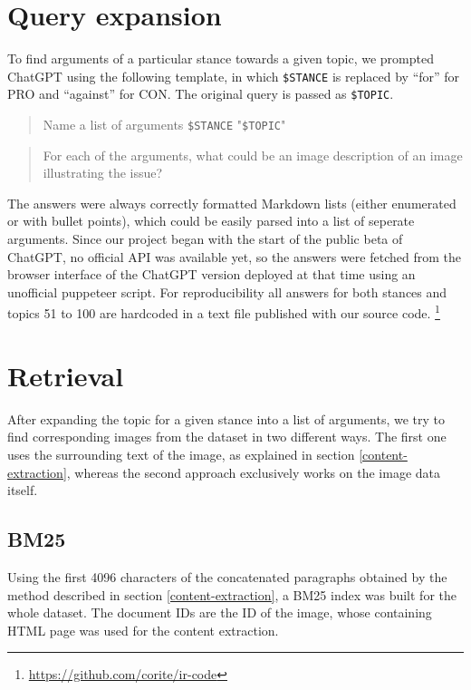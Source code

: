 \documentclass[
]{ceurart}
\begin{document}
\section{Query expansion}

To find arguments of a particular stance towards a given topic, we prompted ChatGPT using the following template, in which \texttt{\$STANCE} is replaced by \enquote{for} for PRO and \enquote{against} for CON. The original query is passed as \texttt{\$TOPIC}.

\begin{quote}
	Name a list of arguments \texttt{\$STANCE} "\texttt{\$TOPIC}"
\end{quote}
\begin{quote}
    For each of the arguments, what could be an image description of an image illustrating the issue?
\end{quote}

The answers were always correctly formatted Markdown lists (either enumerated or with bullet points), which could be easily parsed into a list of seperate arguments. Since our project began with the start of the public beta of ChatGPT, no official API was available yet, so the answers were fetched from the browser interface of the ChatGPT version deployed at that time using an unofficial puppeteer script. For reproducibility all answers for both stances and topics 51 to 100 are hardcoded in a text file published with our source code. \footnote{\url{https://github.com/corite/ir-code}}

\section{Retrieval}

After expanding the topic for a given stance into a list of arguments, we try to find corresponding images from the dataset in two different ways. The first one uses the surrounding text of the image, as explained in section \ref{content-extraction}, whereas the second approach exclusively works on the image data itself.

\subsection{BM25}

Using the first 4096 characters of the concatenated paragraphs obtained by the method described in section \ref{content-extraction}, a BM25 index was built for the whole dataset. The document IDs are the ID of the image, whose containing HTML page was used for the content extraction.
\end{document}
